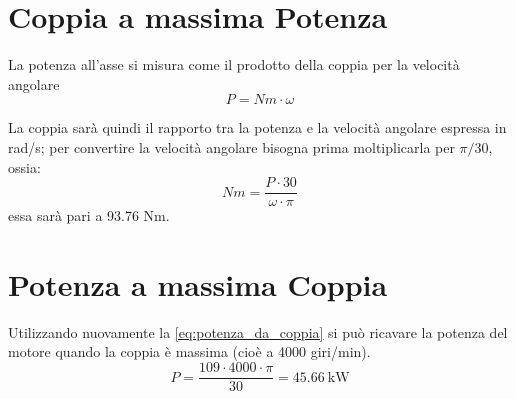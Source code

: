 \documentclass[a4paper,12pt]{article}
\begin{document}
\section{Coppia a massima Potenza}
\label{sec:coppia_a_massima_potenza}
La potenza all'asse si misura come il prodotto della coppia per la velocità angolare
\begin{equation}
    \label{eq:potenza_da_coppia}
    P = Nm \cdot \omega
\end{equation}

La coppia sarà quindi il rapporto tra la potenza e la velocità angolare espressa in rad/s; per convertire la velocità angolare bisogna prima moltiplicarla
per $\pi/30$, ossia:
\begin{equation}
    Nm = \frac{P\cdot 30 }{\omega\cdot \pi}
\end{equation}
essa sarà pari a 93.76 Nm.

\section{Potenza a massima Coppia}
Utilizzando nuovamente la \eqref{eq:potenza_da_coppia} si può ricavare la potenza del motore quando la coppia è massima (cioè a 4000 giri/min).
\begin{equation*}
    P = \frac{109\cdot4000\cdot\pi}{30} = 45.66\ \text{kW}
\end{equation*}
\end{document}
